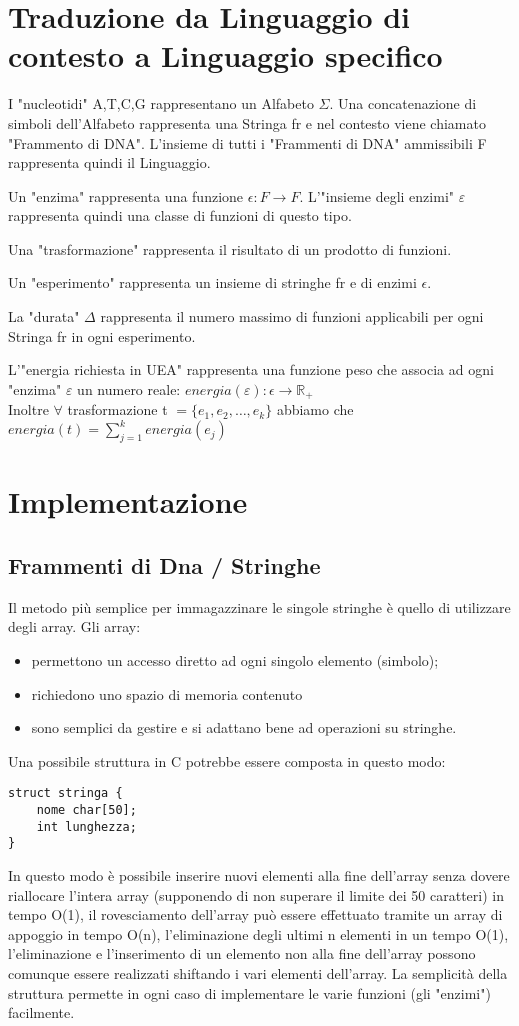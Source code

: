 \documentclass[a4paper,10pt]{article}
\begin{document}
\section{Traduzione da Linguaggio di contesto a Linguaggio specifico}
I "nucleotidi" {A,T,C,G} rappresentano un Alfabeto $\Sigma$. Una concatenazione di simboli dell'Alfabeto rappresenta una Stringa fr e nel contesto viene chiamato "Frammento di DNA". L'insieme di tutti i "Frammenti di DNA" ammissibili {\large F} rappresenta quindi il Linguaggio.

Un "enzima" rappresenta una funzione $\epsilon\colon F\to F$. L'"insieme degli enzimi" $\varepsilon$ rappresenta quindi una classe di funzioni di questo tipo.

Una "trasformazione" rappresenta il risultato di un prodotto di funzioni.

Un "esperimento" rappresenta un insieme di stringhe fr e di enzimi $\epsilon$.

La "durata" $\Delta$ rappresenta il numero massimo di funzioni applicabili per ogni Stringa fr in ogni esperimento.

L'"energia richiesta in UEA" rappresenta una funzione peso che associa ad ogni "enzima" $\varepsilon$ un numero reale: $energia(\varepsilon)\colon\epsilon\to\mathbb{R_+}$
\\Inoltre $\forall$ trasformazione t $=\{e_1,e_2,\dots,e_k\}$ abbiamo che $energia(t)=\sum_{j=1}^k energia(e_j)$

\section{Implementazione}
\subsection{Frammenti di Dna / Stringhe}
Il metodo più semplice per immagazzinare le singole stringhe è quello di utilizzare degli array. Gli array:
\begin{itemize}
\item permettono un accesso diretto ad ogni singolo elemento (simbolo);
\item richiedono uno spazio di memoria contenuto
\item sono semplici da gestire e si adattano bene ad operazioni su stringhe. 
\end{itemize}
Una possibile struttura in C potrebbe essere composta in questo modo:
\begin{verbatim}
struct stringa {
    nome char[50];
    int lunghezza;
}
\end{verbatim} In questo modo è possibile inserire nuovi elementi alla fine dell'array senza dovere riallocare l'intera array (supponendo di non superare il limite dei 50 caratteri) in tempo O(1), il rovesciamento dell'array può essere effettuato tramite un array di appoggio in tempo O(n), l'eliminazione degli ultimi n elementi in un tempo O(1), l'eliminazione e l'inserimento di un elemento non alla fine dell'array possono comunque essere realizzati shiftando i vari elementi dell'array. La semplicità della struttura permette in ogni caso di implementare le varie funzioni (gli "enzimi") facilmente.
\end{document}

